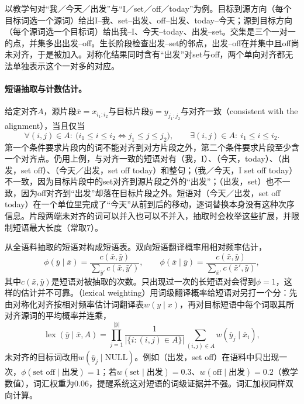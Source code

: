 以教学句对“我／今天／出发”与“I／set／off／today”为例。目标到源方向（每个目标词选一个源词）给出I--我、set--出发、off--出发、today--今天；源到目标方向（每个源词选一个目标词）给出我--I、今天--today、出发--set。交集是三个一对一的点，并集多出出发--off。生长阶段检查出发--set的邻点，出发--off在并集中且off尚未对齐，于是被加入。对称化结果同时含有“出发”对set与off，两个单向对齐都无法单独表示这个一对多的对应。

\paragraph{短语抽取与计数估计。}给定对齐$A$，源片段$\bar x=x_{i_1:i_2}$与目标片段$\bar y=y_{j_1:j_2}$与对齐一致（consistent with the alignment），当且仅当
\begin{equation}
  \forall (i,j)\in A:\ \bigl(i_1\le i\le i_2\iff j_1\le j\le j_2\bigr),
  \qquad
  \exists (i,j)\in A:\ i_1\le i\le i_2.
  \label{eq:nlp-generation-phrase-consistency}
\end{equation}
第一个条件要求片段内的词不能对齐到对方片段之外，第二个条件要求片段至少含一个对齐点。仍用上例，与对齐一致的短语对有（我，I）、（今天，today）、（出发，set off）、（今天／出发，set off today）和整句；（我／今天，I set off today）不一致，因为目标片段中的set对齐到源片段之外的“出发”；（出发，set）也不一致，因为off对齐到“出发”却落在目标片段之外。短语对（今天／出发，set off today）在一个单位里完成了“今天”从前到后的移动，逐词替换本身没有这种次序信息。片段两端未对齐的词可以并入也可以不并入，抽取时会枚举这些扩展，并限制短语最大长度（常取7）。

从全语料抽取的短语对构成短语表。双向短语翻译概率用相对频率估计，
\begin{equation}
  \phi(\bar y\mid\bar x)=\frac{c(\bar x,\bar y)}{\sum_{\bar y'}c(\bar x,\bar y')},\qquad
  \phi(\bar x\mid\bar y)=\frac{c(\bar x,\bar y)}{\sum_{\bar x'}c(\bar x',\bar y)},
  \label{eq:nlp-generation-phrase-prob}
\end{equation}
其中$c(\bar x,\bar y)$是短语对被抽取的次数。只出现过一次的长短语对会得到$\phi=1$，这样的估计并不可靠。（lexical weighting）用词级翻译概率给短语对另打一个分：先由对称化对齐按相对频率估计词翻译表$w(y\mid x)$，再对目标短语中每个词取其所对齐源词的平均概率并连乘，
\begin{equation}
  \operatorname{lex}(\bar y\mid\bar x,A)
  =\prod_{j=1}^{|\bar y|}\frac{1}{|\{i:(i,j)\in A\}|}\sum_{(i,j)\in A}w(\bar y_j\mid\bar x_i),
  \label{eq:nlp-generation-lexical-weighting}
\end{equation}
未对齐的目标词改用$w(\bar y_j\mid\mathrm{NULL})$。例如（出发，set off）在语料中只出现一次，$\phi(\text{set off}\mid\text{出发})=1$；若$w(\text{set}\mid\text{出发})=0.3$、$w(\text{off}\mid\text{出发})=0.2$（教学数值），词汇权重为$0.06$，提醒系统这对短语的词级证据并不强。词汇加权同样双向计算。

